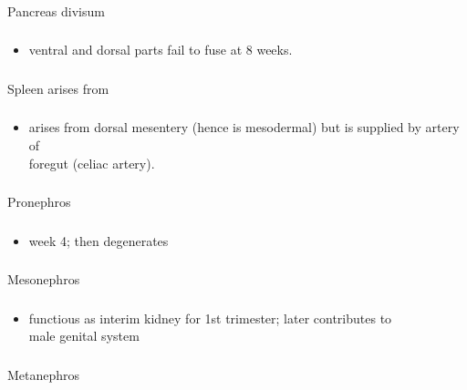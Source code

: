 \documentclass[11pt]{beamer}
\begin{document}
\begin{frame}
 \frametitle{}
Pancreas divisum
\end{frame}

\begin{frame}
 \frametitle{}
\begin{itemize}
\item{ventral and dorsal parts fail to fuse at 8 weeks.}
\end{itemize}
\end{frame}

\begin{frame}
 \frametitle{}
Spleen arises from
\end{frame}

\begin{frame}
 \frametitle{}
\begin{itemize}
\item{arises from dorsal mesentery (hence is mesodermal) but is supplied by artery of \\ foregut (celiac artery).}
\end{itemize}
\end{frame}

\begin{frame}
 \frametitle{}
Pronephros
\end{frame}

\begin{frame}
 \frametitle{}
\begin{itemize}
\item{week 4; then degenerates}
\end{itemize}
\end{frame}

\begin{frame}
 \frametitle{}
Mesonephros 
\end{frame}

\begin{frame}
 \frametitle{}
\begin{itemize}
\item{functious as interim kidney for 1st trimester; later contributes to \\ male genital system}
\end{itemize}
\end{frame}

\begin{frame}
 \frametitle{}
Metanephros
\end{frame}
\end{document}
